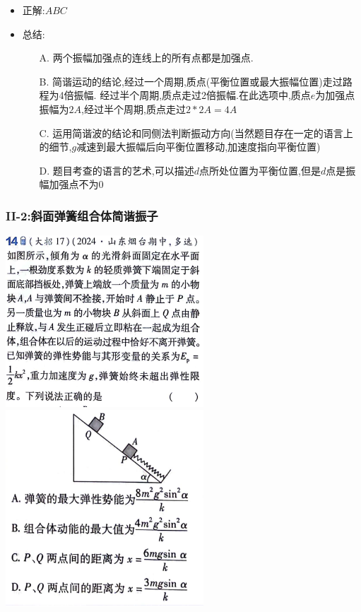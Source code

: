 \documentclass{article}
\begin{document}
\begin{itemize}
    \item 正解:\quad $ABC$
    \item 总结:\quad
          \begin{itemize}
              \item[A.] 两个振幅加强点的连线上的所有点都是加强点.
              \item[B.] 简谐运动的结论,经过一个周期,质点(平衡位置或最大振幅位置)走过路程为4倍振幅.
                  经过半个周期,质点走过2倍振幅.在此选项中,质点$e$为加强点振幅为$2A$,经过半个周期,质点走过$2*2A = 4A$
              \item[C.] 运用简谐波的结论和同侧法判断振动方向(当然题目存在一定的语言上的细节,$g$减速到最大振幅后向平衡位置移动,加速度指向平衡位置)
              \item[D.] 题目考查的语言的艺术,可以描述$d$点所处位置为平衡位置,但是$d$点是振幅加强点不为$0$
          \end{itemize}
\end{itemize}

\vspace{2em}

\subsubsection{II-2:斜面弹簧组合体简谐振子}
\includegraphics[width = 20em]{./pictures/2.1-7.png}
\hspace{2em}
\includegraphics[width = 20em]{./pictures/2.1-8.png}
\end{document}
